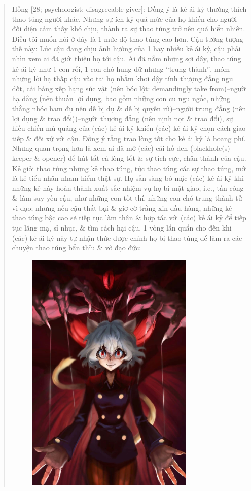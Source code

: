\documentclass[12pt]{article}
\begin{document}
\begin{quote}
	{\sf Hồng [28; psychologist; disagreeable giver]:} Đồng ý là kẻ ái kỷ thường thích thao túng người khác. Nhưng sự ích kỷ quá mức của họ khiến cho người đối diện cảm thấy khó chịu, thành ra sự thao túng trở nên quá hiển nhiên. Điều tôi muốn nói ở đây là 1 mức độ thao túng cao hơn. Cậu tưởng tượng thế này: Lúc cậu đang chịu ảnh hưởng của 1 hay nhiều kẻ ái kỷ, cậu phải nhìn xem ai đã giới thiệu họ tới cậu. Ai đã nắm những sợi dây, thao túng kẻ ái kỷ như 1 con rối, 1 con chó hung dữ nhưng ``trung thành'', móm những lời hạ thấp cậu vào tai họ nhằm khơi dậy tính thượng đẳng ngu dốt, cái bảng xếp hạng súc vật (nên bóc lột: demandingly take from)--người hạ đẳng (nên thuần lợi dụng, bao gồm những con cu ngu ngốc, những thằng nhóc ham đụ nên dễ bị dụ \& dễ bị quyến rũ)--người trung đẳng (nên lợi dụng \& trao đổi))--người thượng đẳng (nên nịnh nọt \& trao đổi), sự hiếu chiến mù quáng của (các) kẻ ái kỷ khiến (các) kẻ ái kỷ chọn cách giao tiếp \& đối xử với cậu. Đồng ý rằng trao lòng tốt cho kẻ ái kỷ là hoang phí. Nhưng quan trọng hơn là xem ai đã mở (các) cái hố đen (blackhole(s) keeper \& opener) để hút tất cả lòng tốt \& sự tích cực, chân thành của cậu. Kẻ giỏi thao túng những kẻ thao túng, tức thao túng các sự thao túng, mới là kẻ tiểu nhân nham hiểm thật sự. Họ sẵn sàng bỏ mặc (các) kẻ ái kỷ khi những kẻ này hoàn thành xuất sắc nhiệm vụ họ bí mật giao, i.e., tấn công \& làm suy yếu cậu, như những con tốt thí, những con chó trung thành tử vì đạo; nhưng nếu cậu thất bại \& giơ cờ trắng xin đầu hàng, những kẻ thao túng bậc cao sẽ tiếp tục làm thân \& hợp tác với (các) kẻ ái kỷ để tiếp tục lăng mạ, sỉ nhục, \& tìm cách hại cậu. 1 vòng lẩn quẩn cho đến khi (các) kẻ ái kỷ này tự nhận thức được chính họ bị thao túng để làm ra các chuyện thao túng bẩn thỉu \& vô đạo đức:
	\begin{figure}[H]
		\centering
		\includegraphics[width = 8cm]{Neferpitou}

\end{figure}
\end{quote}
\end{document}
